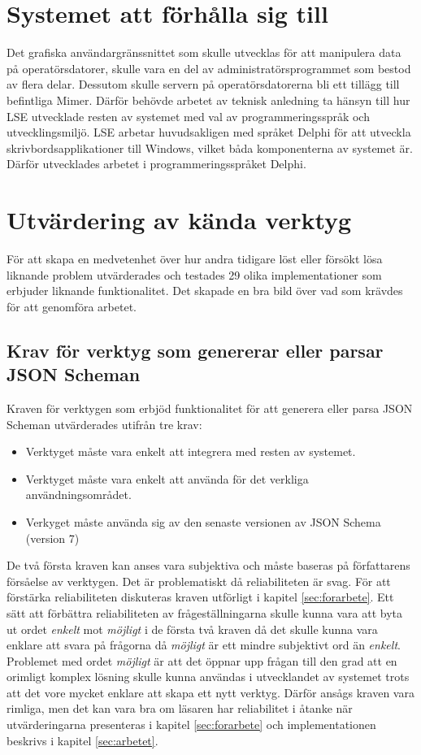 \section{Systemet att förhålla sig till}
\label{sec:metod:förhålla}
Det grafiska användargränssnittet som skulle utvecklas för att manipulera data på operatörsdatorer, skulle vara en del av administratörsprogrammet som bestod av flera delar. Dessutom skulle servern på operatörsdatorerna bli ett tillägg till befintliga Mimer. Därför behövde arbetet av teknisk anledning ta hänsyn till hur LSE utvecklade resten av systemet med val av programmeringsspråk och utvecklingsmiljö. LSE arbetar huvudsakligen med språket Delphi för att utveckla skrivbordsapplikationer till Windows, vilket båda komponenterna av systemet är. Därför utvecklades arbetet i programmeringsspråket Delphi.

\section{Utvärdering av kända verktyg}
\label{sec:metod:utvärdering-verktyg}
För att skapa en medvetenhet över hur andra tidigare löst eller försökt lösa liknande problem utvärderades och testades 29 olika implementationer som erbjuder liknande funktionalitet. Det skapade en bra bild över vad som krävdes för att genomföra arbetet.

\subsection{Krav för verktyg som genererar eller parsar JSON Scheman}
Kraven för verktygen som erbjöd funktionalitet för att generera eller parsa JSON Scheman utvärderades utifrån tre krav:

\begin{itemize}
	\item Verktyget måste vara enkelt att integrera med resten av systemet.
	\item Verktyget måste vara enkelt att använda för det verkliga användningsområdet.
	\item Verkyget måste använda sig av den senaste versionen av JSON Schema (version 7)
\end{itemize}

De två första kraven kan anses vara subjektiva och måste baseras på författarens försåelse av verktygen. Det är problematiskt då reliabiliteten är svag. För att förstärka reliabiliteten diskuteras kraven utförligt i kapitel \ref{sec:forarbete}. Ett sätt att förbättra reliabiliteten av frågeställningarna skulle kunna vara att byta ut ordet \textit{enkelt} mot \textit{möjligt} i de första två kraven då det skulle kunna vara enklare att svara på frågorna då \textit{möjligt} är ett mindre subjektivt ord än \textit{enkelt}. Problemet med ordet \textit{möjligt} är att det öppnar upp frågan till den grad att en orimligt komplex lösning skulle kunna användas i utvecklandet av systemet trots att det vore mycket enklare att skapa ett nytt verktyg. Därför ansågs kraven vara rimliga, men det kan vara bra om läsaren har reliabilitet i åtanke när utvärderingarna presenteras i kapitel \ref{sec:forarbete} och implementationen beskrivs i kapitel \ref{sec:arbetet}.

